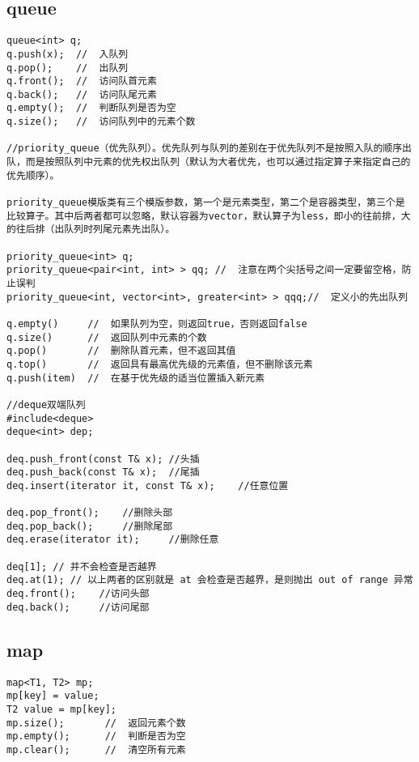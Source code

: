 \subsection{queue}
\begin{lstlisting}
queue<int> q;
q.push(x);  //  入队列
q.pop();    //  出队列
q.front();  //  访问队首元素
q.back();   //  访问队尾元素
q.empty();  //  判断队列是否为空
q.size();   //  访问队列中的元素个数

//priority_queue（优先队列）。优先队列与队列的差别在于优先队列不是按照入队的顺序出队，而是按照队列中元素的优先权出队列（默认为大者优先，也可以通过指定算子来指定自己的优先顺序）。

priority_queue模版类有三个模版参数，第一个是元素类型，第二个是容器类型，第三个是比较算子。其中后两者都可以忽略，默认容器为vector，默认算子为less，即小的往前排，大的往后排（出队列时列尾元素先出队）。

priority_queue<int> q;
priority_queue<pair<int, int> > qq;	//  注意在两个尖括号之间一定要留空格，防止误判
priority_queue<int, vector<int>, greater<int> > qqq;//  定义小的先出队列

q.empty()     //  如果队列为空，则返回true，否则返回false
q.size()      //  返回队列中元素的个数
q.pop()       //  删除队首元素，但不返回其值
q.top()       //  返回具有最高优先级的元素值，但不删除该元素
q.push(item)  //  在基于优先级的适当位置插入新元素

//deque双端队列
#include<deque>
deque<int> dep;

deq.push_front(const T& x); //头插
deq.push_back(const T& x);	//尾插
deq.insert(iterator it, const T& x);	//任意位置

deq.pop_front();	//删除头部
deq.pop_back();		//删除尾部
deq.erase(iterator it);		//删除任意

deq[1]; // 并不会检查是否越界
deq.at(1); // 以上两者的区别就是 at 会检查是否越界，是则抛出 out of range 异常
deq.front();	//访问头部
deq.back();		//访问尾部
\end{lstlisting}


\subsection{map}
\begin{lstlisting}
map<T1, T2> mp;
mp[key] = value;
T2 value = mp[key];
mp.size();       //  返回元素个数
mp.empty();      //  判断是否为空
mp.clear();      //  清空所有元素
\end{lstlisting}


